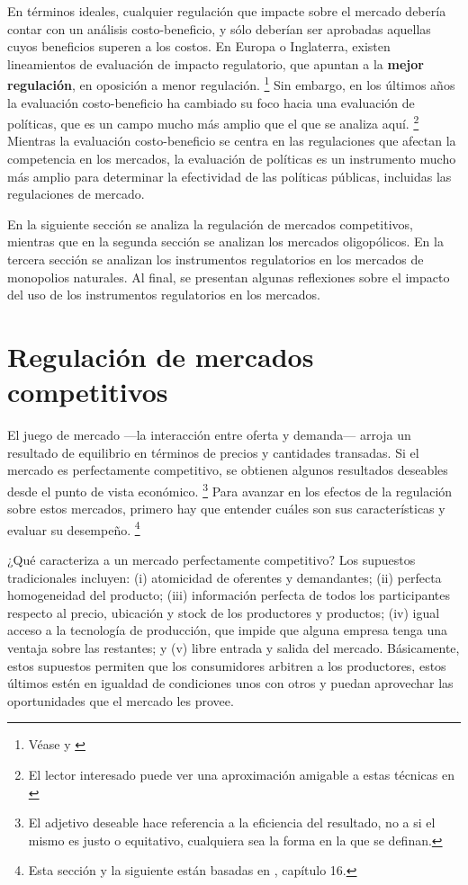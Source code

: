 \documentclass[
  12pt,
  spanish,
]{book}
\begin{document}
En términos ideales, cualquier regulación que impacte sobre el mercado
debería contar con un análisis costo-beneficio, y sólo deberían ser
aprobadas aquellas cuyos beneficios superen a los costos. En Europa o
Inglaterra, existen lineamientos de evaluación de impacto regulatorio,
que apuntan a la \textbf{mejor regulación}, en oposición a menor
regulación. \footnote{Véase \citet{UE2015} y \citet{BRE2015}} Sin
embargo, en los últimos años la evaluación costo-beneficio ha cambiado
su foco hacia una evaluación de políticas, que es un campo mucho más
amplio que el que se analiza aquí. \footnote{El lector interesado puede
  ver una aproximación amigable a estas técnicas en \citet{Gertler2011}}
Mientras la evaluación costo-beneficio se centra en las regulaciones que
afectan la competencia en los mercados, la evaluación de políticas es un
instrumento mucho más amplio para determinar la efectividad de las
políticas públicas, incluidas las regulaciones de mercado.

En la siguiente sección se analiza la regulación de mercados
competitivos, mientras que en la segunda sección se analizan los
mercados oligopólicos. En la tercera sección se analizan los
instrumentos regulatorios en los mercados de monopolios naturales. Al
final, se presentan algunas reflexiones sobre el impacto del uso de los
instrumentos regulatorios en los mercados.

\hypertarget{regulaciuxf3n-de-mercados-competitivos}{%
\section{Regulación de mercados
competitivos}\label{regulaciuxf3n-de-mercados-competitivos}}

El juego de mercado ---la interacción entre oferta y demanda--- arroja
un resultado de equilibrio en términos de precios y cantidades
transadas. Si el mercado es perfectamente competitivo, se obtienen
algunos resultados deseables desde el punto de vista económico.
\footnote{El adjetivo deseable hace referencia a la eficiencia del
  resultado, no a si el mismo es justo o equitativo, cualquiera sea la
  forma en la que se definan.} Para avanzar en los efectos de la
regulación sobre estos mercados, primero hay que entender cuáles son sus
características y evaluar su desempeño. \footnote{Esta sección y la
  siguiente están basadas en \citet{Viscusi2005}, capítulo 16.}

¿Qué caracteriza a un mercado perfectamente competitivo? Los supuestos
tradicionales incluyen: (i) atomicidad de oferentes y demandantes; (ii)
perfecta homogeneidad del producto; (iii) información perfecta de todos
los participantes respecto al precio, ubicación y stock de los
productores y productos; (iv) igual acceso a la tecnología de
producción, que impide que alguna empresa tenga una ventaja sobre las
restantes; y (v) libre entrada y salida del mercado. Básicamente, estos
supuestos permiten que los consumidores arbitren a los productores,
estos últimos estén en igualdad de condiciones unos con otros y puedan
aprovechar las oportunidades que el mercado les provee.
\end{document}
